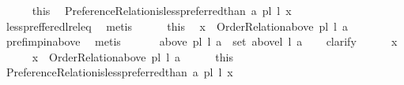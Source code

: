 \begin{isabellebody}
\ \ \ \ \isamarkupfalse%
\ this\ \isamarkupfalse%
\ {\isachardoublequoteopen}Preference{\isacharunderscore}{\kern0pt}Relation{\isachardot}{\kern0pt}is{\isacharunderscore}{\kern0pt}less{\isacharunderscore}{\kern0pt}preferred{\isacharunderscore}{\kern0pt}than\ a\ {\isacharparenleft}{\kern0pt}pl{\isacharunderscore}{\kern0pt}{\isasymalpha}\ l{\isacharparenright}{\kern0pt}\ x{\isachardoublequoteclose}\isanewline
\ \ \ \ \ \ \isamarkupfalse%
\ less{\isacharunderscore}{\kern0pt}preffered{\isacharunderscore}{\kern0pt}l{\isacharunderscore}{\kern0pt}rel{\isacharunderscore}{\kern0pt}eq\ \isamarkupfalse%
\ {\isacharparenleft}{\kern0pt}metis{\isacharparenright}{\kern0pt}\isanewline
\ \ \ \ \isamarkupfalse%
\ this\ \isamarkupfalse%
\ {\isachardoublequoteopen}x\ {\isasymin}\ Order{\isacharunderscore}{\kern0pt}Relation{\isachardot}{\kern0pt}above\ {\isacharparenleft}{\kern0pt}pl{\isacharunderscore}{\kern0pt}{\isasymalpha}\ l{\isacharparenright}{\kern0pt}\ a{\isachardoublequoteclose}\isanewline
\ \ \ \ \ \ \isamarkupfalse%
\ pref{\isacharunderscore}{\kern0pt}imp{\isacharunderscore}{\kern0pt}in{\isacharunderscore}{\kern0pt}above\ \isamarkupfalse%
\ {\isacharparenleft}{\kern0pt}metis{\isacharparenright}{\kern0pt}\isanewline
\ \ \isamarkupfalse%
\isanewline
{}\isamarkupfalse%
\isanewline
\ \ \isamarkupfalse%
\ {\isachardoublequoteopen}above\ {\isacharparenleft}{\kern0pt}pl{\isacharunderscore}{\kern0pt}{\isasymalpha}\ l{\isacharparenright}{\kern0pt}\ a\ {\isasymsubseteq}\ set\ {\isacharparenleft}{\kern0pt}above{\isacharunderscore}{\kern0pt}l\ l\ a{\isacharparenright}{\kern0pt}{\isachardoublequoteclose}\isanewline
\ \ \isamarkupfalse%
\ clarify\isanewline
\ \ \ \ \isamarkupfalse%
\ x\isanewline
\ \ \ \ \isamarkupfalse%
\ {\isachardoublequoteopen}x\ {\isasymin}\ Order{\isacharunderscore}{\kern0pt}Relation{\isachardot}{\kern0pt}above\ {\isacharparenleft}{\kern0pt}pl{\isacharunderscore}{\kern0pt}{\isasymalpha}\ l{\isacharparenright}{\kern0pt}\ a{\isachardoublequoteclose}\isanewline
\ \ \ \ \isamarkupfalse%
\ this\ \isamarkupfalse%
\ {\isachardoublequoteopen}Preference{\isacharunderscore}{\kern0pt}Relation{\isachardot}{\kern0pt}is{\isacharunderscore}{\kern0pt}less{\isacharunderscore}{\kern0pt}preferred{\isacharunderscore}{\kern0pt}than\ a\ {\isacharparenleft}{\kern0pt}pl{\isacharunderscore}{\kern0pt}{\isasymalpha}\ l{\isacharparenright}{\kern0pt}\ x{\isachardoublequoteclose}\isanewline

\end{isabellebody}
